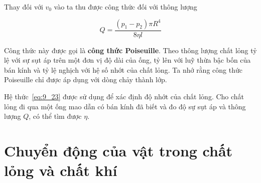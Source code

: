
Thay  đối với $v_0$ vào  ta thu được công thức đối với thông lượng

\begin{equation}\label{eq:9_23}
	Q = \frac{(p_1 - p_2)\pi R^4}{8\eta l}
\end{equation}
\noindent


Công thức này được gọi là \textbf{công thức Poiseuille}. Theo  thông lượng chất lỏng tỷ lệ với sự sụt áp trên một đơn vị độ dài của ống, tỷ lên với luỹ thừa bậc bốn của bán kính và tỷ lệ nghịch với hệ số nhớt của chất lỏng. Ta nhớ rằng công thức Poiseuille chỉ được áp dụng với dòng chảy thành lớp.


Hệ thức~\eqref{eq:9_23} được sử dụng để xác định độ nhớt của chất lỏng. Cho chất lỏng đi qua một ống mao dẫn có bán kính đã biết và đo độ sự sụt áp và thông lượng $Q$, có thể tìm được $\eta$.


\section{Chuyển động của vật trong chất lỏng và chất khí}\label{sec:9_7}


